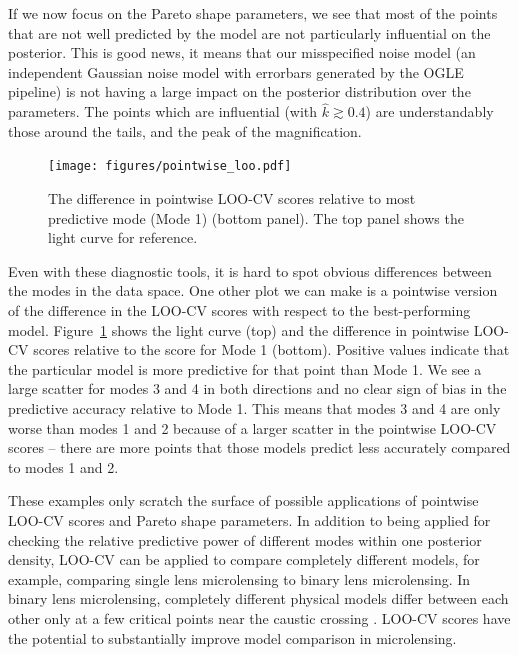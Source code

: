 \documentclass[12pt,dvipsnames]{report}
\begin{document}
If we now focus on the Pareto shape parameters, we see that most of the points 
that are not well predicted by the model are not particularly influential on the 
posterior. This is good news, it means that our misspecified noise model 
(an independent Gaussian noise model with errorbars generated by the OGLE pipeline)
is not having a large impact on the posterior distribution over the parameters.
The points which are influential (with $\hat k\gtrsim 0.4$) are understandably those 
around the tails, and the peak of the magnification. 

\begin{figure}[t]
    \begin{centering}
        \texttt{[image: figures/pointwise\_loo.pdf]}
        \caption{The difference in pointwise LOO-CV scores relative to most predictive 
        mode (Mode 1) (bottom panel). The top panel shows the light curve for reference.}
            \label{fig:pointwise_loo}
    \end{centering}
\end{figure}

Even with these diagnostic tools, it is hard to spot obvious differences between the 
modes in the data space. One other plot we can make is a pointwise version of the 
difference in the LOO-CV scores with respect to the best-performing model.
Figure~\ref{fig:pointwise_loo} shows the light curve (top) and the difference in 
pointwise LOO-CV scores relative to the score for Mode 1 (bottom). Positive values 
indicate that the particular model is more predictive for that point than Mode 1. 
We see a large scatter for modes 3 and 4 in both directions and no clear sign 
of bias in the predictive accuracy relative to Mode 1. This means that modes 
3 and 4 are only worse than modes 1 and 2 because of a larger scatter in the pointwise 
LOO-CV scores -- there are more points that those models predict less accurately 
compared to modes 1 and 2.

These examples only scratch the surface of possible applications of pointwise 
LOO-CV scores and Pareto shape parameters.
In addition to being applied for checking the relative predictive power of 
different modes within one posterior density, LOO-CV can be applied to 
compare completely different models, for example, comparing single lens microlensing to 
binary lens microlensing. In binary lens microlensing, completely different 
physical models differ between each other only at a few critical points 
near the caustic crossing \citep[see for example Figure 1 in ][]{2018AJ....155..259H}. 
LOO-CV scores have the potential to substantially improve model comparison
in microlensing.
\end{document}
